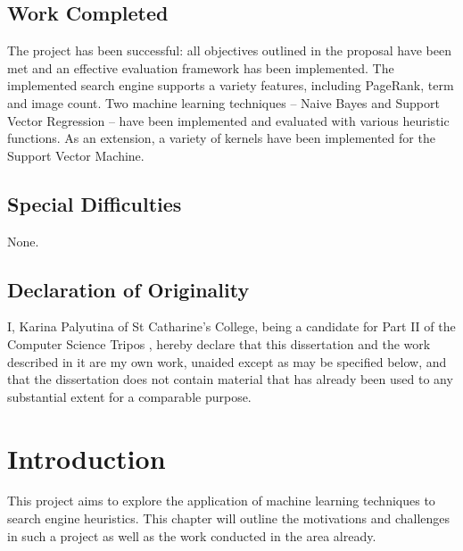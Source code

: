 \documentclass[12pt,notitlepage,twoside]{scrreprt}
\begin{document}
\section*{Work Completed}
The project has been successful: all objectives outlined in the proposal have been met and
an effective evaluation framework has been implemented. The implemented search engine
supports a variety features, including PageRank, term and image count. Two machine learning techniques --
Naive Bayes and Support Vector Regression -- have been implemented and evaluated with
various heuristic functions. As an extension, a variety of kernels have been implemented
for the Support Vector Machine.

\section*{Special Difficulties}
None.

\section*{Declaration of Originality}

I, Karina Palyutina of St Catharine's College, being a candidate for Part II of the Computer
Science Tripos , hereby declare
that this dissertation and the work described in it are my own work,
unaided except as may be specified below, and that the dissertation
does not contain material that has already been used to any substantial
extent for a comparable purpose.

\bigskip
{}

\medskip
{}

\cleardoublepage

\tableofcontents



\cleardoublepage        %

\setcounter{page}{1}
\pagestyle{headings}

\chapter{Introduction}
This project aims to explore the application of machine learning techniques to search
engine heuristics. This chapter will outline the motivations and challenges in such a
project as well as the work conducted in the area already.
\end{document}
